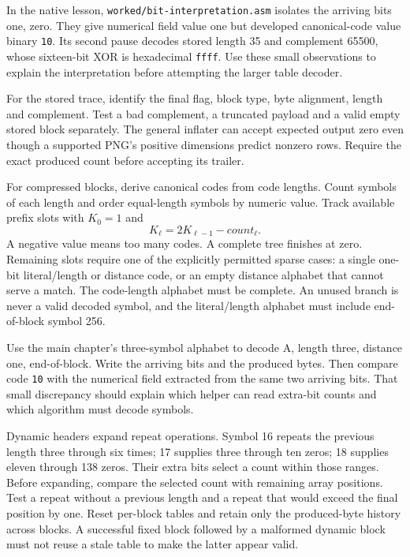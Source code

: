 In the native lesson, \texttt{worked/bit-interpretation.asm} isolates the
arriving bits one, zero. They give numerical field value one but developed
canonical-code value binary \texttt{10}. Its second pause decodes stored length
35 and complement 65500, whose sixteen-bit XOR is hexadecimal \texttt{ffff}.
Use these small observations to explain the interpretation before attempting
the larger table decoder.

For the stored trace, identify the final flag, block type, byte alignment,
length and complement. Test a bad complement, a truncated payload and a valid
empty stored block separately. The general inflater can accept expected output
zero even though a supported PNG's positive dimensions predict nonzero rows.
Require the exact produced count before accepting its trailer.

For compressed blocks, derive canonical codes from code lengths. Count symbols
of each length and order equal-length symbols by numeric value. Track available
prefix slots with $K_0=1$ and
\[
  K_\ell=2K_{\ell-1}-count_\ell.
\]
A negative value means too many codes. A complete tree finishes at zero.
Remaining slots require one of the explicitly permitted sparse cases: a single
one-bit literal/length or distance code, or an empty distance alphabet that
cannot serve a match. The code-length alphabet must be complete. An unused
branch is never a valid decoded symbol, and the literal/length alphabet must
include end-of-block symbol 256.

Use the main chapter's three-symbol alphabet to decode A, length three,
distance one, end-of-block. Write the arriving bits and the produced bytes.
Then compare code \texttt{10} with the numerical field extracted from the same
two arriving bits. That small discrepancy should explain which helper can read
extra-bit counts and which algorithm must decode symbols.

Dynamic headers expand repeat operations. Symbol 16 repeats the previous length
three through six times; 17 supplies three through ten zeros; 18 supplies eleven
through 138 zeros. Their extra bits select a count within those ranges. Before
expanding, compare the selected count with remaining array positions. Test a
repeat without a previous length and a repeat that would exceed the final
position by one. Reset per-block tables and retain only the produced-byte
history across blocks. A successful fixed block followed by a malformed dynamic
block must not reuse a stale table to make the latter appear valid.

